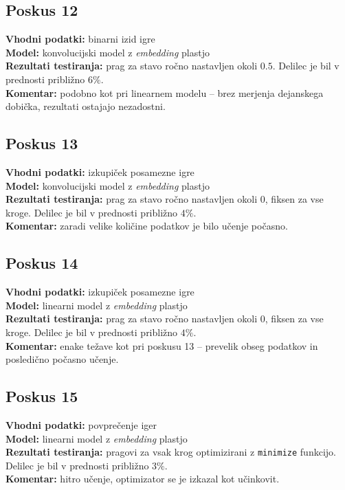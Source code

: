 \documentclass[a4paper,12pt]{article}
\begin{document}
\subsection{Poskus 12}
\textbf{Vhodni podatki:} binarni izid igre \\
\textbf{Model:} konvolucijski model z \textit{embedding} plastjo \\
\textbf{Rezultati testiranja:} prag za stavo ročno nastavljen okoli $0.5$. Delilec je bil v prednosti približno $6\%$. \\
\textbf{Komentar:} podobno kot pri linearnem modelu – brez merjenja dejanskega dobička, rezultati ostajajo nezadostni.

\subsection{Poskus 13}
\textbf{Vhodni podatki:} izkupiček posamezne igre \\
\textbf{Model:} konvolucijski model z \textit{embedding} plastjo \\
\textbf{Rezultati testiranja:} prag za stavo ročno nastavljen okoli $0$, fiksen za vse kroge. Delilec je bil v prednosti približno $4\%$. \\
\textbf{Komentar:} zaradi velike količine podatkov je bilo učenje počasno.

\subsection{Poskus 14}
\textbf{Vhodni podatki:} izkupiček posamezne igre \\
\textbf{Model:} linearni model z \textit{embedding} plastjo \\
\textbf{Rezultati testiranja:} prag za stavo ročno nastavljen okoli $0$, fiksen za vse kroge. Delilec je bil v prednosti približno $4\%$. \\
\textbf{Komentar:} enake težave kot pri poskusu 13 – prevelik obseg podatkov in posledično počasno učenje.

\subsection{Poskus 15}
\textbf{Vhodni podatki:} povprečenje iger \\
\textbf{Model:} linearni model z \textit{embedding} plastjo \\
\textbf{Rezultati testiranja:} pragovi za vsak krog optimizirani z \texttt{minimize} funkcijo. 
Delilec je bil v prednosti približno $3\%$. \\
\textbf{Komentar:} hitro učenje, optimizator se je izkazal kot učinkovit.
\end{document}
